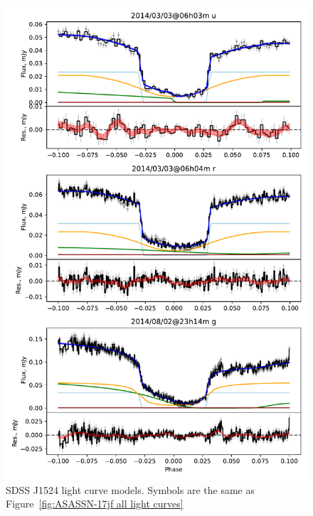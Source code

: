 \begin{figure}
    \centering
    \includegraphics[width=\textwidth]{figures/results/SDSS1524/SDSS1524_1.pdf}
    \caption{SDSS J1524 light curve models. Symbols are the same as Figure~\ref{fig:ASASSN-17jf all light curves}}
    \label{fig:SDSS1524 all light curves}
\end{figure}
